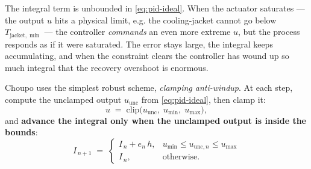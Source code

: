 \documentclass[11pt,a4paper]{article}
\begin{document}
The integral term is unbounded in \eqref{eq:pid-ideal}.  When the
actuator saturates --- the output $u$ hits a physical limit, e.g.
the cooling-jacket cannot go below $T_{\mathrm{jacket}, \min}$ ---
the controller \emph{commands} an even more extreme $u$, but the
process responds as if it were saturated.  The error stays large,
the integral keeps accumulating, and when the constraint clears
the controller has wound up so much integral that the recovery
overshoot is enormous.

Choupo uses the simplest robust scheme, \emph{clamping anti-windup}.
At each step, compute the unclamped output $u_{\mathrm{unc}}$ from
\eqref{eq:pid-ideal}, then clamp it:
\[
    u \;=\; \mathrm{clip}\bigl(u_{\mathrm{unc}},\; u_{\min},\; u_{\max}\bigr),
\]
and \textbf{advance the integral only when the unclamped output is
inside the bounds}:
\begin{equation}
    I_{\,n+1}
    \;=\;
    \begin{cases}
        I_{\,n} + e_n\,h, & u_{\min} \le u_{\mathrm{unc},n} \le u_{\max} \\[2pt]
        I_{\,n},          & \text{otherwise}.
    \end{cases}
    \label{eq:antiwindup}
\end{equation}
\end{document}
